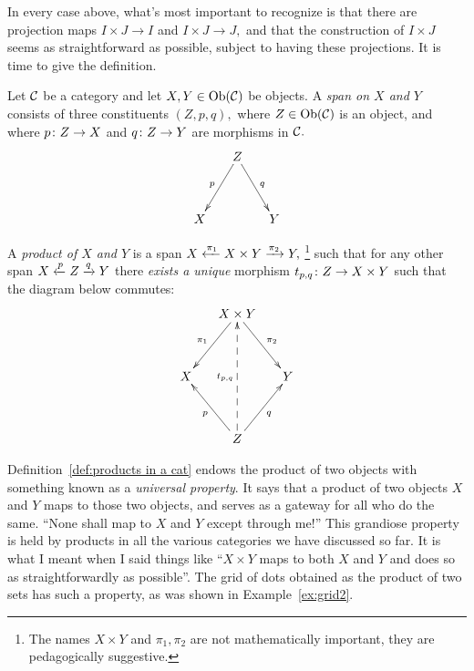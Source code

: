 \documentclass[CT4S-EN-RU]{subfiles}
\begin{document}
\begin{exerciseRUS}
\end{exerciseRUS}

\begin{blockENG}
In every case above, what's most important to recognize is that there are projection maps $I\times J\to I$ and $I\times J\to J,$ and that the construction of $I\times J$ seems as straightforward as possible, subject to having these projections. It is time to give the definition.
\end{blockENG}

\begin{blockRUS}
\end{blockRUS}

\begin{definitionENG}\label{def:products in a cat}
Let $\mathcal{C}$ be a category and let $X,Y\in\textnormal{Ob}(\mathcal{C})$ be objects. A {\em span on $X$ and $Y$} consists of three constituents $(Z,p,q),$ where $Z\in\textnormal{Ob}(\mathcal{C})$ is an object, and where $p\colon Z\rightarrow X$ and $q\colon Z\rightarrow Y$ are morphisms in $\mathcal{C}.$ 
$$\xymatrix@=15pt{&Z\ar[ldd]_p\ar[rdd]^q\\\\X&&Y}$$   

A {\em product of $X$ and $Y$} is a span $X\xleftarrow{\pi_1}X\times Y\xrightarrow{\pi_2}Y,$ \footnote{The names $X\times Y$ and $\pi_1,\pi_2$ are not mathematically important, they are pedagogically suggestive.} such that for any other span $X\xleftarrow{p}Z\xrightarrow{q}Y$ there {\em exists a unique} morphism $t_{p,q}\colon Z\rightarrow X\times Y$ such that the diagram below commutes:
$$
\xymatrix@=15pt{&X\times Y\ar[ldd]_{\pi_1}\ar[rdd]^{\pi_2}\\\\X&&Y\\\\&Z\ar[uul]^{p}\ar[uur]_q\ar@{-->}[uuuu]^{t_{p,q}}}
$$
\end{definitionENG}

\begin{definitionRUS}\label{def:products in a cat}
\end{definitionRUS}

\begin{remarkENG}\label{rem:gateway}
Definition~\ref{def:products in a cat} endows the product of two objects with something known as a {\em universal property}. It says that a product of two objects $X$ and $Y$ maps to those two objects, and serves as a gateway for all who do the same. “None shall map to $X$ and $Y$ except through me!” This grandiose property is held by  products in all the various categories we have discussed so far. It is what I meant when I said things like “$X\times Y$ maps to both $X$ and $Y$ and does so as straightforwardly as possible”.  The grid of dots obtained as the product of two sets has such a property, as was shown in Example~\ref{ex:grid2}.
\end{remarkENG}
\end{document}
